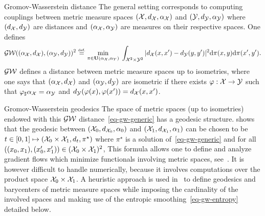 \begin{rem}{Gromov-Wasserstein distance}
	The general setting corresponds to computing couplings between metric measure spaces $(\mathcal{X},d_{\mathcal{X}},\alpha_{\mathcal{X}})$
	and $(\mathcal{Y},d_{\mathcal{Y}},\alpha_{\mathcal{Y}})$ where $(d_{\mathcal{X}},d_{\mathcal{Y}})$ are distances and $(\alpha_{\mathcal{X}},\alpha_{\mathcal{Y}})$ are measures on their respective spaces.
	One defines 
	\begin{align}
		\label{eq-gw-generic}
		\operatorname{\mathcal{GW}}( (\alpha_{\mathcal{X}},d_{\mathcal{X}}), (\alpha_{\mathcal{Y}},d_{\mathcal{Y}}) )^2 \stackrel{\mbox{\upshape\tiny def.}}{=} 
		\underset{ \pi \in \mathrm{\textbf{\upshape U}}(\alpha_{\mathcal{X}},\alpha_Y) }{\min}\; 
		\int_{\mathcal{X}^2 \times \mathcal{Y}^2}
		| d_{\mathcal{X}}(x,x')-d_{\mathcal{Y}}(y,y') |^2
		\mathrm{d}\pi(x,y)\mathrm{d}\pi(x',y').
	\end{align}
	$\operatorname{\mathcal{GW}}$ defines a distance between metric measure spaces up to isometries, where one says that $(\alpha_{\mathcal{X}},d_{\mathcal{X}})$ and $(\alpha_{\mathcal{Y}},d_{\mathcal{Y}}) $ are isometric if there exists $\varphi : \mathcal{X} \rightarrow \mathcal{Y}$ such that $\varphi_{\sharp}\alpha_{\mathcal{X}}=\alpha_{\mathcal{Y}}$ and $d_{\mathcal{Y}}(\varphi(x),\varphi(x'))=d_{\mathcal{X}}(x,x')$.
\end{rem}



\begin{rem}{Gromov-Wasserstein geodesics}
The space of metric spaces (up to isometries) endowed with this $\operatorname{\mathcal{GW}}$ distance~\eqref{eq-gw-generic} has a geodesic structure. \cite{SturmGW} shows that the geodesic between  $(\mathcal{X}_0,d_{\mathcal{X}_0},\alpha_0)$ and $(\mathcal{X}_1,d_{\mathcal{X}_1},\alpha_1)$ can be chosen to be 
$t \in [0,1] \mapsto (\mathcal{X}_0 \times \mathcal{X}_1,d_t,\pi^\star)$ where $\pi^\star$ is a solution of~\eqref{eq-gw-generic} and for all $((x_0,x_1), (x_0',x_1')) \in (\mathcal{X}_0 \times \mathcal{X}_1)^2$, 
This formula allows one to define and analyze gradient flows which minimize functionals involving metric spaces, see~\cite{SturmGW}. It is however difficult to handle numerically, because it involves computations over the product space $\mathcal{X}_0 \times \mathcal{X}_1$. 
%
A heuristic approach is used in~\cite{peyre2016gromov} to define geodesics and barycenters of metric measure spaces while imposing the cardinality of the involved spaces and making use of the entropic smoothing~\eqref{eq-gw-entropy} detailed below.
\end{rem}

